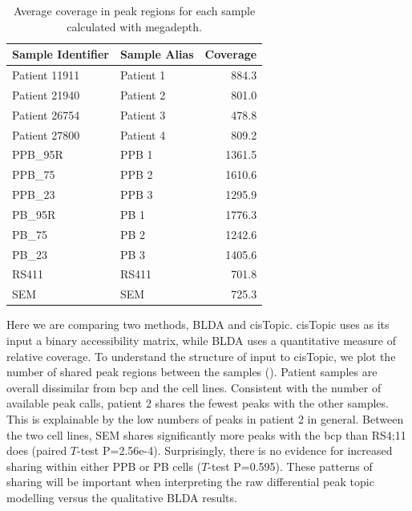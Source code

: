 \begin{table}[]
    \centering
    \begin{tabular}{@{}llr@{}}
    \toprule
    Sample Identifier & Sample Alias & Coverage \\ \midrule
    Patient 11911     & Patient 1    & 884.3                        \\
    Patient 21940     & Patient 2    & 801.0                        \\
    Patient 26754     & Patient 3    & 478.8                        \\
    Patient 27800     & Patient 4    & 809.2                        \\
    PPB\_95R          & PPB 1        & 1361.5                       \\
    PPB\_75           & PPB 2        & 1610.6                       \\
    PPB\_23           & PPB 3        & 1295.9                       \\
    PB\_95R           & PB 1         & 1776.3                       \\
    PB\_75            & PB 2         & 1242.6                       \\
    PB\_23            & PB 3         & 1405.6                       \\
    RS411             & RS411        & 701.8                        \\
    SEM               & SEM          & 725.3                        \\ \bottomrule
    \end{tabular}
    \caption{Average coverage in peak regions for each sample calculated with megadepth.}
    \label{table:mll_cov}
\end{table}

Here we are comparing two methods, BLDA and cisTopic. cisTopic uses as its input a binary accessibility matrix, while BLDA uses a quantitative measure of relative coverage. To understand the structure of input to cisTopic, we plot the number of shared peak regions between the samples (). Patient samples are overall dissimilar from \gls{bcp} and the cell lines. Consistent with the number of available peak calls, patient 2 shares the fewest peaks with the other samples. This is explainable by the low numbers of peaks in patient 2 in general. Between the two cell lines, SEM shares significantly more peaks with the \gls{bcp} than RS4;11 does (paired $T$-test P=2.56e-4). Surprisingly, there is no evidence for increased sharing within either PPB or PB cells ($T$-test P=0.595). These patterns of sharing will be important when interpreting the raw differential peak topic modelling versus the qualitative BLDA results.

